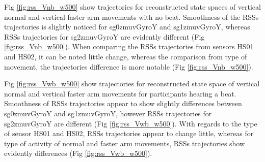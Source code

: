 Fig \ref{fig:rss_Vnb_w500} show trajectories for reconstructed state spaces
of vertical normal and vertical faster arm movements with no beat. 
Smoothness of the RSSs trajectories is slightly noticed for sg0zmuvGyroY and
sg1zmuvGyroY, whereas RSSs trajectories for sg2zmuvGyroY are evidently 
different (Fig \ref{fig:rss_Vnb_w500}).
When comparing the RSSs trajectories from sensors HS01 and HS02,
it can be noted little change, whereas the comparison from type of movement, 
the trajectories difference is more notable (Fig \ref{fig:rss_Vnb_w500}).

Fig \ref{fig:rss_Vwb_w500} show trajectories for reconstructed state space
of vertical normal and vertical faster arm movements for participants 
hearing a beat. Smoothness of RSSs trajectories appear to show slightly 
differences between sg0zmuvGyroY and sg1zmuvGyroY, however RSSs trajectories 
for sg2zmuvGyroY are different (Fig \ref{fig:rss_Vwb_w500}).
With regards to the type of sensor HS01 and HS02, RSSs trajectories appear 
to change little, whereas for type of activity of normal and faster arm 
movements, RSSs trajectories show evidently differences 
(Fig \ref{fig:rss_Vwb_w500}).

